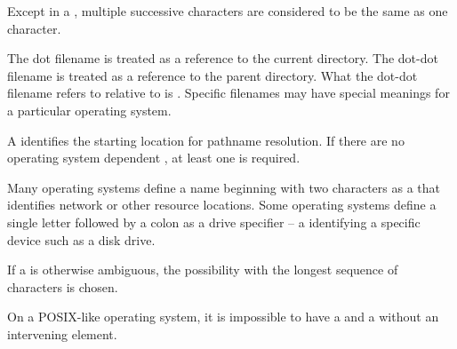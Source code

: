 \pnum
Except in a ,
multiple successive  characters are considered to
be the same as one  character.

\pnum
The dot filename is treated as a reference to the current directory.
The dot-dot filename is treated as a reference to the parent directory.
What the dot-dot filename refers to
relative to  is .
Specific filenames may have special meanings for a particular operating system.

\pnum
A  identifies the
starting location for pathname resolution.
If there are no operating system dependent ,
at least one \impldefrootname{}  is required.
\begin{note}
Many operating systems define a name
beginning with two  characters
as a  that identifies
network or other resource locations.
Some operating systems
define a single letter followed by a colon
as a drive specifier -- a 
identifying a specific device such as a disk drive.
\end{note}

\pnum
If a  is otherwise ambiguous,
the possibility with the longest sequence of characters is chosen.
\begin{note}
On a POSIX-like operating system, it is impossible to have a
 and a 
without an intervening  element.
\end{note}

